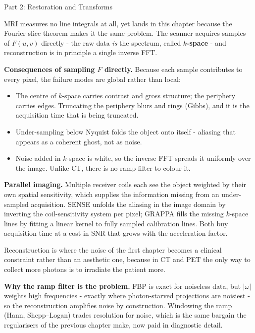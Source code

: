 \documentclass[letterpaper]{article}
\begin{document}
\begin{notes}{Part 2: Restoration and Transforms}

MRI measures no line integrals at all, yet lands in this chapter because the Fourier slice theorem makes it the same problem. The scanner acquires samples of $F(u,v)$ directly - the raw data \emph{is} the spectrum, called \textbf{$k$-space} - and reconstruction is in principle a single inverse FFT.

\textbf{Consequences of sampling $F$ directly.} Because each sample contributes to every pixel, the failure modes are global rather than local:
\begin{itemize}[noitemsep,topsep=2pt]
    \item The centre of $k$-space carries contrast and gross structure; the periphery carries edges. Truncating the periphery blurs and rings (Gibbs), and it is the acquisition time that is being truncated.
    \item Under-sampling below Nyquist folds the object onto itself - aliasing that appears as a coherent ghost, not as noise.
    \item Noise added in $k$-space is white, so the inverse FFT spreads it uniformly over the image. Unlike CT, there is no ramp filter to colour it.
\end{itemize}

\textbf{Parallel imaging.} Multiple receiver coils each see the object weighted by their own spatial sensitivity, which supplies the information missing from an under-sampled acquisition. SENSE unfolds the aliasing in the image domain by inverting the coil-sensitivity system per pixel; GRAPPA fills the missing $k$-space lines by fitting a linear kernel to fully sampled calibration lines. Both buy acquisition time at a cost in SNR that grows with the acceleration factor.


Reconstruction is where the noise of the first chapter becomes a clinical constraint rather than an aesthetic one, because in CT and PET the only way to collect more photons is to irradiate the patient more.

\textbf{Why the ramp filter is the problem.} FBP is exact for noiseless data, but $|\omega|$ weights high frequencies - exactly where photon-starved projections are noisiest - so the reconstruction amplifies noise by construction. Windowing the ramp (Hann, Shepp--Logan) trades resolution for noise, which is the same bargain the regularisers of the previous chapter make, now paid in diagnostic detail.


\end{notes}
\end{document}
